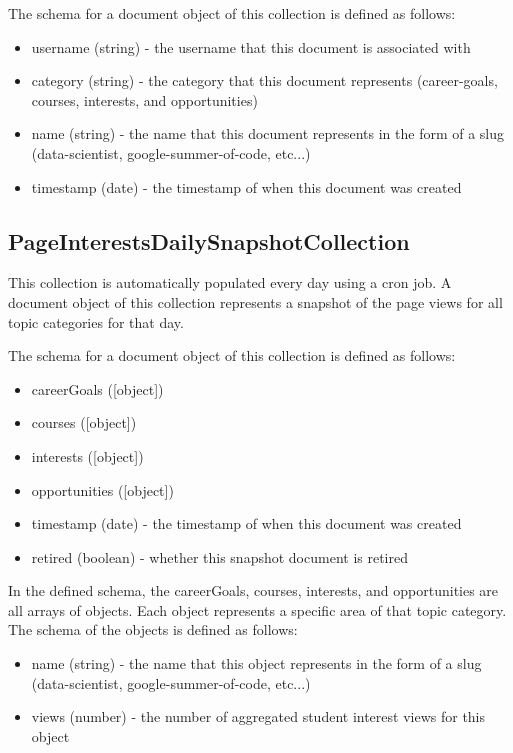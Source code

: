 \documentclass[english]{proposalnsf}
\begin{document}
    The schema for a document object of this collection is defined as follows:
    \begin{itemize}
        \item username (string) - the username that this document is associated with
        \item category (string) - the category that this document represents (career-goals, courses, interests, and opportunities)
        \item name (string) - the name that this document represents in the form of a slug (data-scientist, google-summer-of-code, etc...)
        \item timestamp (date) - the timestamp of when this document was created
    \end{itemize}

    \subsection{PageInterestsDailySnapshotCollection}
    \label{sec:pageinterestsdailysnapshotcollection}
      This collection is automatically populated every day using a cron job. A document object of this collection represents a snapshot of the page views for all topic categories for that day.

      The schema for a document object of this collection is defined as follows:
      \begin{itemize}
            \item careerGoals ([object])
            \item courses ([object])
            \item interests ([object])
            \item opportunities ([object])
            \item timestamp (date) - the timestamp of when this document was created
            \item retired (boolean) - whether this snapshot document is retired
      \end{itemize}

      In the defined schema, the careerGoals, courses, interests, and opportunities are all arrays of objects. Each object represents a specific area of that topic category. The schema of the objects is defined as follows:
      \begin{itemize}
          \item name (string) - the name that this object represents in the form of a slug (data-scientist, google-summer-of-code, etc...)
          \item views (number) - the number of aggregated student interest views for this object
      \end{itemize}
\end{document}
